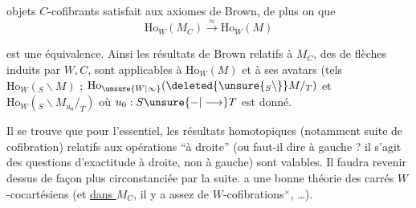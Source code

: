 
objets $C$-cofibrants satisfait aux axiomes de Brown, de plus on   que
\[
 \mathrm{Ho}_{W}(M_C)\xrightarrow{\approx}\mathrm{Ho}_{W}(M)
\]

est une équivalence. Ainsi les résultats de Brown relatifs à $M_C$,  des  de flèches induits par $W,C$, sont applicables à $\mathrm{Ho}_W(M)$ et à ses avatars (tels $\mathrm{Ho}_W({}_S\backslash M)$ ; $\mathrm{Ho}_{\unsure{W|\infty}}(\deleted{\unsure{{}_S\backslash}}M/_{T})$ et $\mathrm{Ho}_{W}({}_S\backslash M_{u_0}/_{T})$ où $u_0:S\unsure{\mathbin{-}|\longrightarrow} T$ est donné.

Il se trouve que pour l'essentiel, les résultats homotopiques  (notamment suite  de cofibration) relatifs aux opérations  ``à droite'' (ou faut-il dire à gauche ? il s'agit  des questions d'exactitude à droite, non à gauche) sont valables. Il  faudra revenir dessus de façon plus circonstanciée par la suite.   a une bonne théorie des carrés $W$-cocartésiens (et \uline{dans $M_C$}, il y a assez de $W$-cofibrations$^{\times}$, \ldots).


